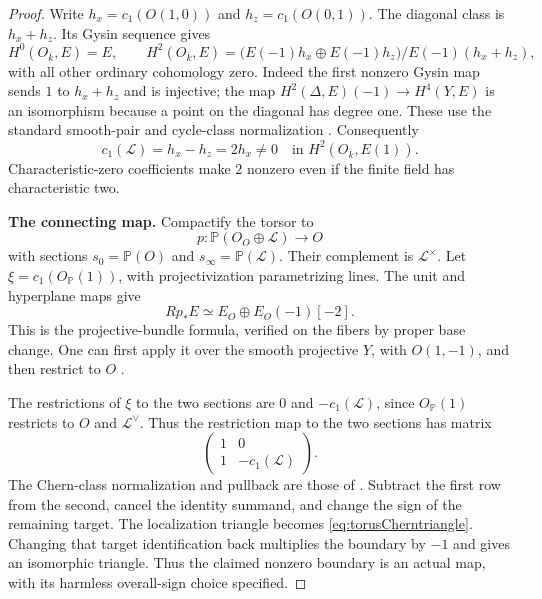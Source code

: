 \begin{proof}
Write \(h_x=c_1(O(1,0))\) and \(h_z=c_1(O(0,1))\).
The diagonal class is \(h_x+h_z\). Its Gysin sequence gives
\begin{equation}\label{eq:offdiagonalcohomology}
 H^0(O_{\bar k},E)=E,\qquad
 H^2(O_{\bar k},E)
   =\bigl(E(-1)h_x\oplus E(-1)h_z\bigr)/
                         E(-1)(h_x+h_z),
\end{equation}
with all other ordinary cohomology zero.
Indeed the first nonzero Gysin map sends \(1\) to
\(h_x+h_z\) and is injective; the map
\(H^2(\Delta,E)(-1)\to H^4(Y,E)\) is an isomorphism
because a point on the diagonal has degree one.
These use the standard smooth-pair and cycle-class normalization
\cite[Theorem~16.1 and Corollary~16.2, p.~108;
\(\S23\), pp.~138--139; Remark~24.2(b), p.~145]{Milne}.
Consequently
\begin{equation}\label{eq:torusnonzeroChern}
 c_1(\mathcal L)=h_x-h_z=2h_x\ne0
                       \quad\text{in }H^2(O_{\bar k},E(1)).
\end{equation}
Characteristic-zero coefficients make \(2\) nonzero even if
the finite field has characteristic two.

\par\smallskip\noindent\textbf{The connecting map.}\quad
Compactify the torsor to
\[
 p:\mathbb P(O_O\oplus\mathcal L)\to O
\]
with sections \(s_0=\mathbb P(O)\) and
\(s_\infty=\mathbb P(\mathcal L)\).
Their complement is \(\mathcal L^\times\).
Let \(\xi=c_1(O_{\mathbb P}(1))\), with projectivization
parametrizing lines. The unit and hyperplane maps give
\[
                   Rp_*E\simeq E_O\oplus E_O(-1)[-2].
\]
This is the projective-bundle formula, verified on the fibers
by proper base change. One can first apply it over the smooth
projective \(Y\), with \(O(1,-1)\), and then restrict to \(O\)
\cite[Theorem~23.2, pp.~139--140]{Milne}.

The restrictions of \(\xi\) to the two sections are \(0\) and
\(-c_1(\mathcal L)\), since \(O_{\mathbb P}(1)\) restricts
to \(O\) and \(\mathcal L^\vee\). Thus the restriction map to
the two sections has matrix
\begin{equation}\label{eq:twoSectionChernMatrix}
                    \begin{pmatrix}
                     1&0\\
                     1&-c_1(\mathcal L)
                    \end{pmatrix}.
\end{equation}
The Chern-class normalization and pullback are those of
\cite[Theorem~23.3(a),(b), p.~140]{Milne}.
Subtract the first row from the second, cancel the identity
summand, and change the sign of the remaining target.
The localization triangle becomes
\eqref{eq:torusCherntriangle}.
Changing that target identification back multiplies the
boundary by \(-1\) and gives an isomorphic triangle.
Thus the claimed nonzero boundary is an actual map, with
its harmless overall-sign choice specified.


\end{proof}
